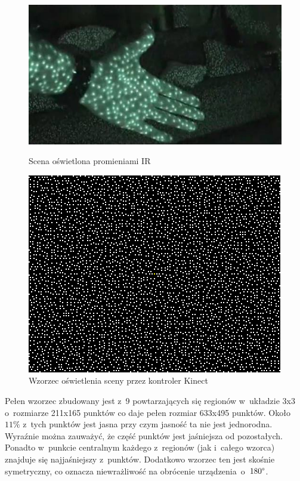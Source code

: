 \begin{figure}
	\centering
	\begin{minipage}[b]{0.48\linewidth}
		\centering   
		\includegraphics[width=\textwidth]{images/kinectNightVision.jpg}	
		\caption{Scena oświetlona promieniami IR\cite{flatley2011}}
		\label{fig:characteristics:kinect:nightVision}
	\end{minipage}
	\begin{minipage}[b]{0.48\linewidth}
		\centering 
		\includegraphics[width=\textwidth]{images/kinect-pattern_3x3.png}
		\caption{Wzorzec oświetlenia sceny przez kontroler Kinect \cite{reichinger2011}}
		\label{fig:characteristics:kinect:dotPattern}
	\end{minipage}	
\end{figure}
		
Pełen wzorzec zbudowany jest z~9 powtarzających się regionów w~układzie 3x3 o~rozmiarze 211x165 punktów co daje pełen rozmiar 633x495 punktów. Około $11\%$ z~tych punktów jest jasna przy czym jasność ta nie jest jednorodna. Wyraźnie można zauważyć, że część punktów jest jaśniejsza od pozostałych. Ponadto w~punkcie centralnym każdego z~regionów (jak i~całego wzorca) znajduje się najjaśniejszy z~punktów. Dodatkowo wzorzec ten jest skośnie symetryczny, co oznacza niewrażliwość na obrócenie urządzenia~o~$180\degree$.\\
		

